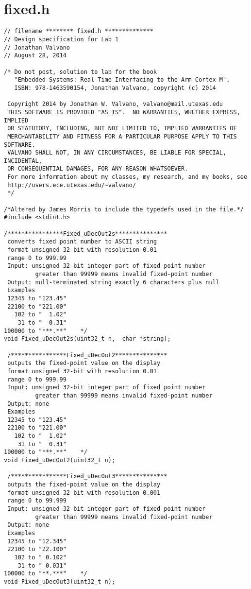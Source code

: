 \documentclass{article}
\begin{document}
\newpage
\appendix
\section{\\fixed.h} \label{App:AppendixA}

\begin{verbatim}
// filename ******** fixed.h ************** 
// Design specification for Lab 1 
// Jonathan Valvano
// August 28, 2014

/* Do not post, solution to lab for the book
   "Embedded Systems: Real Time Interfacing to the Arm Cortex M",
   ISBN: 978-1463590154, Jonathan Valvano, copyright (c) 2014

 Copyright 2014 by Jonathan W. Valvano, valvano@mail.utexas.edu
 THIS SOFTWARE IS PROVIDED "AS IS".  NO WARRANTIES, WHETHER EXPRESS, IMPLIED
 OR STATUTORY, INCLUDING, BUT NOT LIMITED TO, IMPLIED WARRANTIES OF
 MERCHANTABILITY AND FITNESS FOR A PARTICULAR PURPOSE APPLY TO THIS SOFTWARE.
 VALVANO SHALL NOT, IN ANY CIRCUMSTANCES, BE LIABLE FOR SPECIAL, INCIDENTAL,
 OR CONSEQUENTIAL DAMAGES, FOR ANY REASON WHATSOEVER.
 For more information about my classes, my research, and my books, see
 http://users.ece.utexas.edu/~valvano/
 */

/*Altered by James Morris to include the typedefs used in the file.*/
#include <stdint.h>

/****************Fixed_uDecOut2s***************
 converts fixed point number to ASCII string
 format unsigned 32-bit with resolution 0.01
 range 0 to 999.99
 Input: unsigned 32-bit integer part of fixed point number
         greater than 99999 means invalid fixed-point number
 Output: null-terminated string exactly 6 characters plus null
 Examples
 12345 to "123.45"  
 22100 to "221.00"
   102 to "  1.02" 
    31 to "  0.31" 
100000 to "***.**"    */ 
void Fixed_uDecOut2s(uint32_t n,  char *string);

 /****************Fixed_uDecOut2***************
 outputs the fixed-point value on the display
 format unsigned 32-bit with resolution 0.01
 range 0 to 999.99
 Input: unsigned 32-bit integer part of fixed point number
         greater than 99999 means invalid fixed-point number
 Output: none
 Examples
 12345 to "123.45"  
 22100 to "221.00"
   102 to "  1.02" 
    31 to "  0.31" 
100000 to "***.**"    */ 
void Fixed_uDecOut2(uint32_t n);

 /****************Fixed_uDecOut3***************
 outputs the fixed-point value on the display
 format unsigned 32-bit with resolution 0.001
 range 0 to 99.999
 Input: unsigned 32-bit integer part of fixed point number
         greater than 99999 means invalid fixed-point number
 Output: none
 Examples
 12345 to "12.345"  
 22100 to "22.100"
   102 to " 0.102" 
    31 to " 0.031" 
100000 to "**.***"    */ 
void Fixed_uDecOut3(uint32_t n);


\end{verbatim}
\end{document}

